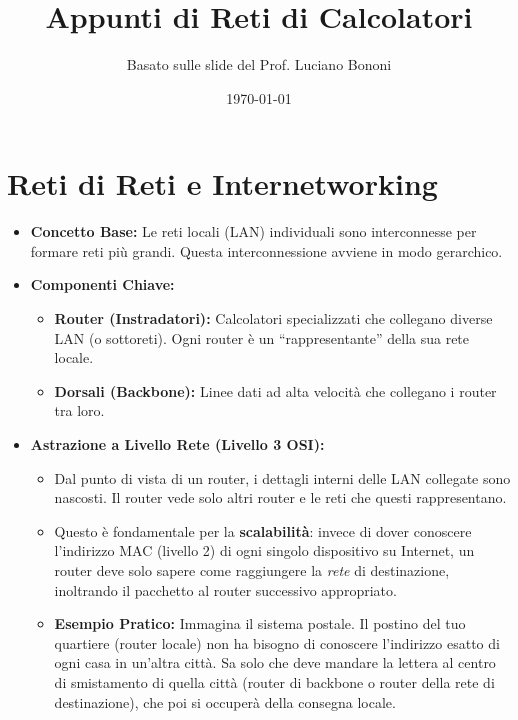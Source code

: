 


\title{Appunti di Reti di Calcolatori}
\author{Basato sulle slide del Prof. Luciano Bononi}
\date{\today}



\maketitle
\tableofcontents
\newpage

\section{Reti di Reti e Internetworking}
\begin{itemize}
    \item \textbf{Concetto Base:} Le reti locali (LAN) individuali sono interconnesse per formare reti più grandi. Questa interconnessione avviene in modo gerarchico.
    \item \textbf{Componenti Chiave:}
    \begin{itemize}
        \item \textbf{Router (Instradatori):} Calcolatori specializzati che collegano diverse LAN (o sottoreti). Ogni router è un ``rappresentante'' della sua rete locale.
        \item \textbf{Dorsali (Backbone):} Linee dati ad alta velocità che collegano i router tra loro.
    \end{itemize}
    \item \textbf{Astrazione a Livello Rete (Livello 3 OSI):}
    \begin{itemize}
        \item Dal punto di vista di un router, i dettagli interni delle LAN collegate sono nascosti. Il router vede solo altri router e le reti che questi rappresentano.
        \item Questo è fondamentale per la \textbf{scalabilità}: invece di dover conoscere l'indirizzo MAC (livello 2) di ogni singolo dispositivo su Internet, un router deve solo sapere come raggiungere la \textit{rete} di destinazione, inoltrando il pacchetto al router successivo appropriato.
        \item \textbf{Esempio Pratico:} Immagina il sistema postale. Il postino del tuo quartiere (router locale) non ha bisogno di conoscere l'indirizzo esatto di ogni casa in un'altra città. Sa solo che deve mandare la lettera al centro di smistamento di quella città (router di backbone o router della rete di destinazione), che poi si occuperà della consegna locale.

\end{itemize}
\end{itemize}
